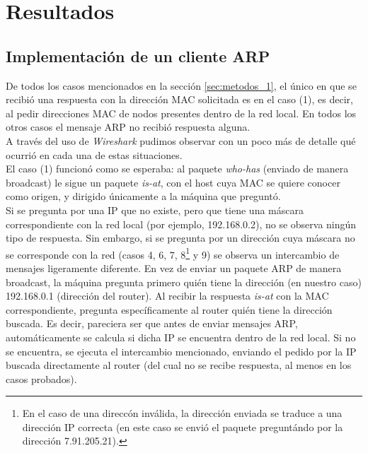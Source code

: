 \section{Resultados}

\subsection{Implementaci\'on de un cliente ARP}

De todos los casos mencionados en la secci\'on \ref{sec:metodos_1}, el \'unico en que se recibi\'o una respuesta con la direcci\'on MAC solicitada es en el caso (1), es decir, al pedir direcciones MAC de nodos presentes dentro de la red local. En todos los otros casos el mensaje ARP no recibi\'o respuesta alguna.\\

A trav\'es del uso de \emph{Wireshark} pudimos observar con un poco m\'as de detalle qu\'e ocurri\'o en cada una de estas situaciones.\\

El caso (1) funcion\'o como se esperaba: al paquete \emph{who-has} (enviado de manera broadcast) le sigue un paquete \emph{is-at}, con el host cuya MAC se quiere conocer como origen, y dirigido \'unicamente a la m\'aquina que pregunt\'o.\\

Si se pregunta por una IP que no existe, pero que tiene una m\'ascara correspondiente con la red local (por ejemplo, 192.168.0.2), no se observa ning\'un tipo de respuesta. Sin embargo, si se pregunta por un direcci\'on cuya m\'ascara no se corresponde con la red (casos 4, 6, 7, 8\footnote{En el caso de una direcc\'on inv\'alida, la direcci\'on enviada se traduce a una direcci\'on IP correcta (en este caso se envi\'o el paquete pregunt\'ando por la direcci\'on 7.91.205.21).} y 9) se observa un intercambio de mensajes ligeramente diferente. En vez de enviar un paquete ARP de manera broadcast, la m\'aquina pregunta primero qui\'en tiene la direcci\'on (en nuestro caso) 192.168.0.1 (direcci\'on del router). Al recibir la respuesta \emph{is-at} con la MAC correspondiente, pregunta espec\'ificamente al router qui\'en tiene la direcci\'on buscada. Es decir, pareciera ser que antes de enviar mensajes ARP, autom\'aticamente se calcula si dicha IP se encuentra dentro de la red local. Si no se encuentra, se ejecuta el 
intercambio mencionado, enviando el pedido por la IP buscada directamente al router (del cual no se recibe respuesta, al menos en los casos probados).\\

